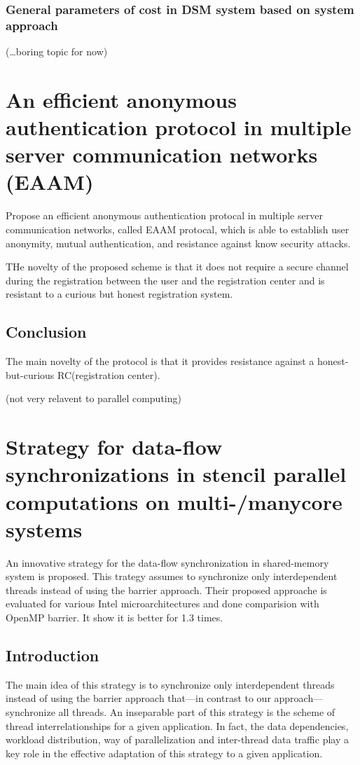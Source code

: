 \documentclass[11pt]{article}
\begin{document}
\subsubsection{General parameters of cost in DSM system based on system approach}
\label{sec-2-2-2}

(\ldots{}boring topic for now)

\section{An efficient anonymous authentication protocol in multiple server communication networks (EAAM)  \cite{braeken17_effic_anony_authen_protoc_multip}}
\label{sec-3}
Propose an efficient anonymous authentication protocal in multiple server communication networks, called EAAM protocal, which is able to establish user anonymity, mutual authentication, and resistance against know security attacks.

THe novelty of the proposed scheme is that it does not require a secure channel during the registration between the user and the registration center and is resistant to a curious but honest registration system.

\subsection{Conclusion}
\label{sec-3-1}
The main novelty of the protocol is that it provides resistance against a honest-but-curious RC(registration center).

(not very relavent to parallel computing)


\section{Strategy for data-flow synchronizations in stencil parallel computations on multi-/manycore systems \cite{szustak18_strat_data_flow_synch_stenc}}
\label{sec-4}
An innovative strategy for the data-flow synchronization in shared-memory system is proposed. This trategy assumes to synchronize only interdependent threads instead of using the barrier approach.
Their proposed approache is evaluated for various Intel microarchitectures and done comparision with OpenMP barrier. It show it is better for 1.3 times.

\subsection{Introduction}
\label{sec-4-1}
The main idea of this strategy is to synchronize only interdependent threads instead of using the barrier approach that—in contrast to our approach—synchronize all threads. An inseparable part of this strategy is the scheme of thread interrelationships for a given application. In fact, the data dependencies, workload distribution, way of parallelization and inter-thread data traffic play a key role in the effective adaptation of this strategy to a given application.
\end{document}

